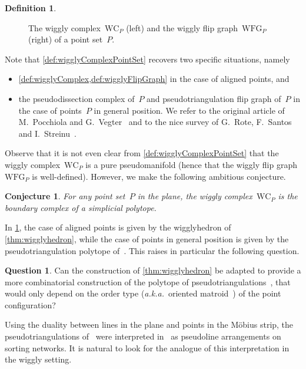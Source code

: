 \documentclass{amsart}
\newtheorem{conjecture}[theorem]{Conjecture}
\theoremstyle{definition}
\newtheorem{definition}[theorem]{Definition}
\newtheorem{question}[theorem]{Question}
\newcommand{\aka}{\textit{a.k.a.}~} %
\newcommand{\wigglyComplex}{\mathrm{WC}} %
\newcommand{\wigglyFlipGraph}{\mathrm{WFG}} %
\begin{document}
\begin{definition}
\begin{figure}[!h]
\caption{The wiggly complex~$\wigglyComplex_P$ (left) and the wiggly flip graph~$\wigglyFlipGraph_P$ (right) of a point set~$P$.}
\label{fig:wigglyComplexSquarre}
\end{figure}
\end{definition}

Note that \cref{def:wigglyComplexPointSet} recovers two specific situations, namely
\begin{itemize}
\item \cref{def:wigglyComplex,def:wigglyFlipGraph} in the case of aligned points, and
\item the pseudodissection complex of~$P$ and pseudotriangulation flip graph of~$P$ in the case of points~$P$ in general position. We refer to the original article of M.~Pocchiola and G.~Vegter~\cite{PocchiolaVegter} and to the nice survey of G.~Rote, F.~Santos and I.~Streinu~\cite{RoteSantosStreinu-pseudotriangulations}.
\end{itemize}

Observe that it is not even clear from \cref{def:wigglyComplexPointSet} that the wiggly complex~$\wigglyComplex_P$ is a pure pseudomanifold (hence that the wiggly flip graph~$\wigglyFlipGraph_P$ is well-defined).
However, we make the following ambitious conjecture.

\begin{conjecture}
\label{conj:polytopality}
For any point set~$P$ in the plane, the wiggly complex~$\wigglyComplex_P$ is the boundary complex of a simplicial polytope.
\end{conjecture}

In \cref{conj:polytopality}, the case of aligned points is given by the wigglyhedron of \cref{thm:wigglyhedron}, while the case of points in general position is given by the pseudotriangulation polytope of~\cite{RoteSantosStreinu-polytope}.
This raises in particular the following question.

\begin{question}
Can the construction of \cref{thm:wigglyhedron} be adapted to provide a more combinatorial construction of the polytope of pseudotriangulations~\cite{RoteSantosStreinu-polytope}, that would only depend on the order type (\aka oriented matroid~\cite{BjornerLasVergnasSturmfelsWhiteZiegler}) of the point configuration?
\end{question}

Using the duality between lines in the plane and points in the M\"obius strip, the pseudotriangulations of~\cite{PocchiolaVegter,RoteSantosStreinu-pseudotriangulations} were interpreted in~\cite{PilaudPocchiola} as pseudoline arrangements on sorting networks.
It is natural to look for the analogue of this interpretation in the wiggly setting.
\end{document}
